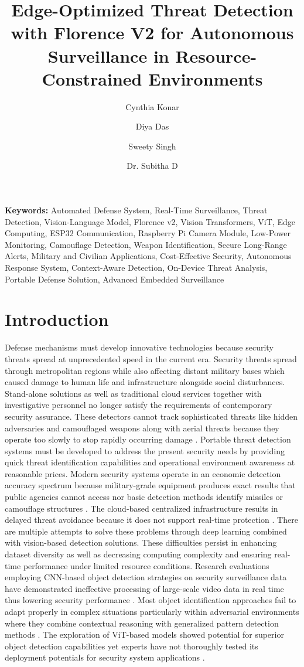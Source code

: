 \documentclass[fleqn,10pt,lineno]{wlpeerj}
\title{Edge-Optimized Threat Detection with Florence V2 for Autonomous Surveillance in Resource-Constrained Environments}
\author[1]{Cynthia Konar}
\author[2]{Diya Das}
\author[3]{Sweety Singh}
\author[4]{Dr. Subitha D}
\affil[1,2]{B.Tech CSE, Vellore Institute of Technology, Chennai, India}
\affil[3]{B.Tech CSE with CPS, Vellore Institute of Technology, Chennai, India}
\affil[4]{Assistant Professor Senior Grade 2, Vellore Institute of Technology, Chennai, India}
\begin{document}
\flushbottom
\maketitle
\thispagestyle{empty}

\noindent \textbf{Keywords:} Automated Defense System, Real-Time Surveillance, Threat Detection, Vision-Language Model, Florence v2, Vision Transformers, ViT, Edge Computing, ESP32 Communication, Raspberry Pi Camera Module, Low-Power Monitoring, Camouflage Detection, Weapon Identification, Secure Long-Range Alerts, Military and Civilian Applications, Cost-Effective Security, Autonomous Response System, Context-Aware Detection, On-Device Threat Analysis, Portable Defense Solution, Advanced Embedded Surveillance

\section*{Introduction}
Defense mechanisms must develop innovative technologies because security threats spread at unprecedented speed in the current era. Security threats spread through metropolitan regions while also affecting distant military bases which caused damage to human life and infrastructure alongside social disturbances. Stand-alone solutions as well as traditional cloud services together with investigative personnel no longer satisfy the requirements of contemporary security assurance. These detectors cannot track sophisticated threats like hidden adversaries and camouflaged weapons along with aerial threats because they operate too slowly to stop rapidly occurring damage \cite{1}.
Portable threat detection systems must be developed to address the present security needs by providing quick threat identification capabilities and operational environment awareness at reasonable prices. Modern security systems operate in an economic detection accuracy spectrum because military-grade equipment produces exact results that public agencies cannot access nor basic detection methods identify missiles or camouflage structures \cite{2}. The cloud-based centralized infrastructure results in delayed threat avoidance because it does not support real-time protection \cite{3}.
There are multiple attempts to solve these problems through deep learning combined with vision-based detection solutions. These difficulties persist in enhancing dataset diversity as well as decreasing computing complexity and ensuring real-time performance under limited resource conditions. Research evaluations employing CNN-based object detection strategies on security surveillance data have demonstrated ineffective processing of large-scale video data in real time thus lowering security performance \cite{4}. Most object identification approaches fail to adapt properly in complex situations particularly within adversarial environments where they combine contextual reasoning with generalized pattern detection methods \cite{5}. The exploration of ViT-based models showed potential for superior object detection capabilities yet experts have not thoroughly tested its deployment potentials for security system applications \cite{2}. 
\end{document}
